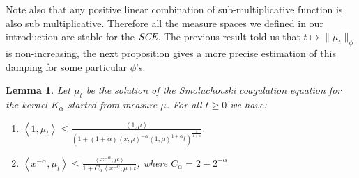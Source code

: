 \documentclass[11pt,a4paper]{article}
\newcommand{\SCE}{\emph{SCE}}
\newtheorem{lemma}[theorem]{Lemma}
\begin{document}
Note also that any positive linear combination of sub-multiplicative function is also sub multiplicative. Therefore all the measure spaces we defined in our introduction are stable for the $\SCE$. The previous result told us that $t \mapsto \|\mu_t\|_{\phi}$ is non-increasing, the next proposition gives a more precise estimation of this damping for some particular $\phi$'s. 
\begin{lemma}\label{lem:bound_smol_1}
    Let $\mu_t$ be the solution of the Smoluchovski coagulation equation for the kernel $K_\alpha$ started from measure $\mu$. For all $t\geq 0$ we have:
    \begin{enumerate}[label=(\roman*)]
        \item \( \left\langle 1, \mu_t \right\rangle \leq \frac{\left\langle 1, \mu \right\rangle}{\left(1 + (1 + \alpha)\left\langle x, \mu \right\rangle^{-\alpha} \left\langle 1, \mu \right\rangle^{1 + \alpha} t \right)^{\frac{1}{1 + \alpha}}}.\)
        \item \(\left\langle x^{-\alpha}, \mu_t \right\rangle \leq \frac{\left\langle x^{-\alpha}, \mu \right\rangle}{1 + C_\alpha\left\langle x^{-\alpha}, \mu \right\rangle t }\), where $C_\alpha = 2 - 2^{-\alpha}$
    \end{enumerate}
\end{lemma}
\end{document}
